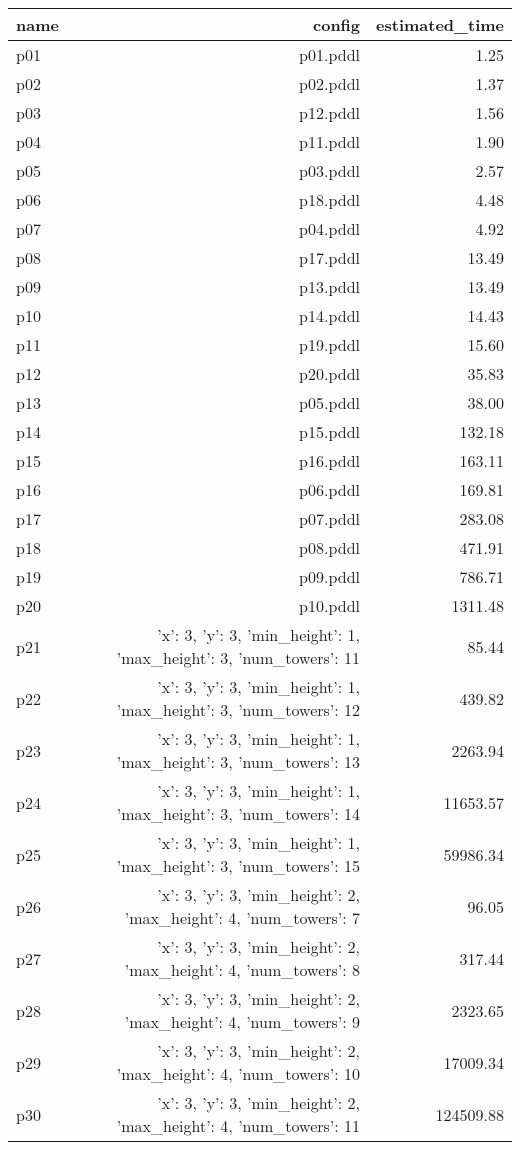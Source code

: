 \documentclass{article}
\begin{document}
                            \begin{center}
                            \scriptsize
                            \begin{tabular}{@{}l|r|r@{}}
                            name & config & estimated\_time\\\midrule
                              p01& p01.pddl&1.25\\
  p02& p02.pddl&1.37\\
  p03& p12.pddl&1.56\\
  p04& p11.pddl&1.90\\
  p05& p03.pddl&2.57\\
  p06& p18.pddl&4.48\\
  p07& p04.pddl&4.92\\
  p08& p17.pddl&13.49\\
  p09& p13.pddl&13.49\\
  p10& p14.pddl&14.43\\
  p11& p19.pddl&15.60\\
  p12& p20.pddl&35.83\\
  p13& p05.pddl&38.00\\
  p14& p15.pddl&132.18\\
  p15& p16.pddl&163.11\\
  p16& p06.pddl&169.81\\
  p17& p07.pddl&283.08\\
  p18& p08.pddl&471.91\\
  p19& p09.pddl&786.71\\
  p20& p10.pddl&1311.48\\
  p21&{'x': 3, 'y': 3, 'min\_height': 1, 'max\_height': 3, 'num\_towers': 11}&85.44\\
  p22&{'x': 3, 'y': 3, 'min\_height': 1, 'max\_height': 3, 'num\_towers': 12}&439.82\\
  p23&{'x': 3, 'y': 3, 'min\_height': 1, 'max\_height': 3, 'num\_towers': 13}&2263.94\\
  p24&{'x': 3, 'y': 3, 'min\_height': 1, 'max\_height': 3, 'num\_towers': 14}&11653.57\\
  p25&{'x': 3, 'y': 3, 'min\_height': 1, 'max\_height': 3, 'num\_towers': 15}&59986.34\\
  p26&{'x': 3, 'y': 3, 'min\_height': 2, 'max\_height': 4, 'num\_towers': 7}&96.05\\
  p27&{'x': 3, 'y': 3, 'min\_height': 2, 'max\_height': 4, 'num\_towers': 8}&317.44\\
  p28&{'x': 3, 'y': 3, 'min\_height': 2, 'max\_height': 4, 'num\_towers': 9}&2323.65\\
  p29&{'x': 3, 'y': 3, 'min\_height': 2, 'max\_height': 4, 'num\_towers': 10}&17009.34\\
  p30&{'x': 3, 'y': 3, 'min\_height': 2, 'max\_height': 4, 'num\_towers': 11}&124509.88
                            \end{tabular}
                            \end{center}
                    
\end{document}
